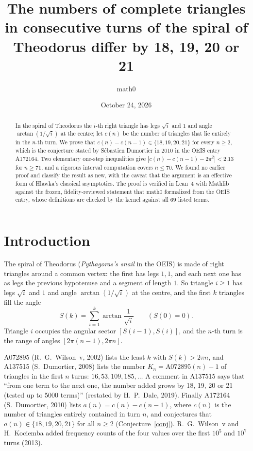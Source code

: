\documentclass[11pt]{amsart}
\title[Turns of the spiral of Theodorus]{The numbers of complete triangles in consecutive turns of the spiral of Theodorus differ by 18, 19, 20 or 21}
\author{math0}
\date{October 24, 2026}
\theoremstyle{plain}
\theoremstyle{definition}
\begin{document}
\begin{abstract}
In the spiral of Theodorus the $i$-th right triangle has legs $\sqrt i$ and $1$ and angle $\arctan(1/\sqrt i)$ at the centre; let $c(n)$ be the number of triangles that lie entirely in the $n$-th turn.
We prove that $c(n)-c(n-1)\in\{18,19,20,21\}$ for every $n\ge2$, which is the conjecture stated by S\'ebastien Dumortier in 2010 in the OEIS entry A172164.
Two elementary one-step inequalities give $|c(n)-c(n-1)-2\pi^2|<2.13$ for $n\ge71$, and a rigorous interval computation covers $n\le70$.
We found no earlier proof and classify the result as new, with the caveat that the argument is an effective form of Hlawka's classical asymptotics.
The proof is verified in Lean~4 with Mathlib against the frozen, fidelity-reviewed statement that math0 formalized from the OEIS entry, whose definitions are checked by the kernel against all $69$ listed terms.
\end{abstract}
\maketitle

\section{Introduction}

The spiral of Theodorus (\emph{Pythagoras's snail} in the OEIS) is made of right triangles around a common vertex: the first has legs $1,1$, and each next one has as legs the previous hypotenuse and a segment of length $1$.
So triangle $i\ge1$ has legs $\sqrt i$ and $1$ and angle $\arctan(1/\sqrt i)$ at the centre, and the first $k$ triangles fill the angle
\[
  S(k)=\sum_{i=1}^{k}\arctan\frac1{\sqrt i}\qquad(S(0)=0).
\]
Triangle $i$ occupies the angular sector $[S(i-1),S(i)]$, and the $n$-th turn is the range of angles $[2\pi(n-1),2\pi n]$.

A072895 \cite{A072895} (R.~G.~Wilson~v, 2002) lists the least $k$ with $S(k)>2\pi n$, and A137515 \cite{A137515} (S.~Dumortier, 2008) lists the number $K_n=\text{A072895}(n)-1$ of triangles in the first $n$ turns: $16,53,109,185,\dots$
A comment in A137515 says that ``from one term to the next one, the number added grows by 18, 19, 20 or 21 (tested up to 5000 terms)'' (restated by H.~P.~Dale, 2019).
Finally A172164 \cite{A172164} (S.~Dumortier, 2010) lists $a(n)=c(n)-c(n-1)$, where $c(n)$ is the number of triangles entirely contained in turn $n$, and conjectures that $a(n)\in\{18,19,20,21\}$ for all $n\ge2$ (Conjecture~\ref{conj}).
R.~G.~Wilson~v and H.~Kociemba added frequency counts of the four values over the first $10^5$ and $10^7$ turns (2013).
\end{document}
